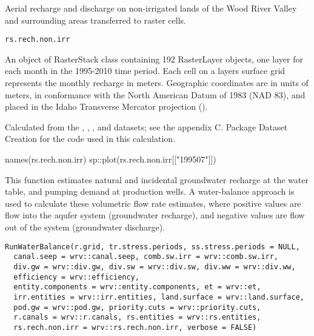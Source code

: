 \documentclass[a4paper]{book}
\begin{document}
\begin{Description}\relax
Aerial recharge and discharge on non-irrigated lands of the Wood River Valley and
surrounding areas transferred to raster cells.
\end{Description}
%
\begin{Usage}
\begin{verbatim}
rs.rech.non.irr
\end{verbatim}
\end{Usage}
%
\begin{Format}
An object of RasterStack class containing 192 RasterLayer objects,
one layer for each month in the 1995-2010 time period.
Each cell on a layers surface grid represents the monthly recharge in meters.
Geographic coordinates are in units of meters, in conformance with the
North American Datum of 1983 (NAD 83), and placed in the
Idaho Transverse Mercator projection ().
\end{Format}
%
\begin{Source}\relax
Calculated from the , ,
, and  datasets;
see the appendix C. Package Dataset Creation for the \R{} code used in this calculation.
\end{Source}
%
\begin{Examples}
\begin{ExampleCode}
names(rs.rech.non.irr)
sp::plot(rs.rech.non.irr[["199507"]])

\end{ExampleCode}
\end{Examples}
%
\begin{Description}\relax
This function estimates natural and incidental groundwater recharge at the water table,
and pumping demand at production wells.
A water-balance approach is used to calculate these volumetric flow rate estimates,
where positive values are flow into the aqufer system (groundwater recharge),
and negative values are flow out of the system (groundwater discharge).
\end{Description}
%
\begin{Usage}
\begin{verbatim}
RunWaterBalance(r.grid, tr.stress.periods, ss.stress.periods = NULL,
  canal.seep = wrv::canal.seep, comb.sw.irr = wrv::comb.sw.irr,
  div.gw = wrv::div.gw, div.sw = wrv::div.sw, div.ww = wrv::div.ww,
  efficiency = wrv::efficiency,
  entity.components = wrv::entity.components, et = wrv::et,
  irr.entities = wrv::irr.entities, land.surface = wrv::land.surface,
  pod.gw = wrv::pod.gw, priority.cuts = wrv::priority.cuts,
  r.canals = wrv::r.canals, rs.entities = wrv::rs.entities,
  rs.rech.non.irr = wrv::rs.rech.non.irr, verbose = FALSE)
\end{verbatim}
\end{Usage}
\end{document}
